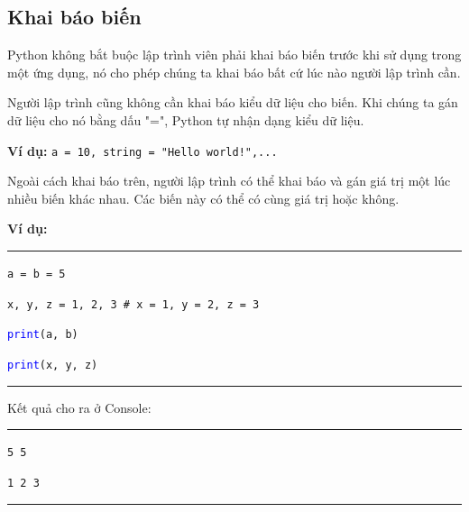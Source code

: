 \subsection{Khai báo biến}
Python không bắt buộc lập trình viên phải khai báo biến trước khi sử dụng trong một ứng dụng, nó cho phép chúng ta khai báo bất cứ lúc nào người lập trình cần.\par
Người lập trình cũng không cần khai báo kiểu dữ liệu cho biến. Khi chúng ta gán dữ liệu cho nó bằng dấu "=", Python tự nhận dạng kiểu dữ liệu.\par
\textbf{Ví dụ:} \texttt{a = 10, string = "Hello world!",...}\par
Ngoài cách khai báo trên, người lập trình có thể khai báo và gán giá trị một lúc nhiều biến khác nhau. Các biến này có thể có cùng giá trị hoặc không.\par
\textbf{Ví dụ:}\\
\rule{\linewidth}{0.2mm}\par
\begin{linenumbers}
	\texttt{a = b = 5}\par
	\texttt{x, y, z = 1, 2, 3 \# x = 1, y = 2, z = 3}\par
	\texttt{\textcolor{blue}{print}(a, b)}\par
	\texttt{\textcolor{blue}{print}(x, y, z)}\par
\end{linenumbers}
\rule{\linewidth}{0.2mm}\par
\noindent
\resetlinenumber
Kết quả cho ra ở Console:\\
\rule{\linewidth}{0.2mm}\par
\begin{linenumbers}
	\texttt{5 5}\par
	\texttt{1 2 3}
\end{linenumbers}
\rule{\linewidth}{0.2mm}\par
\resetlinenumber
\newpage
